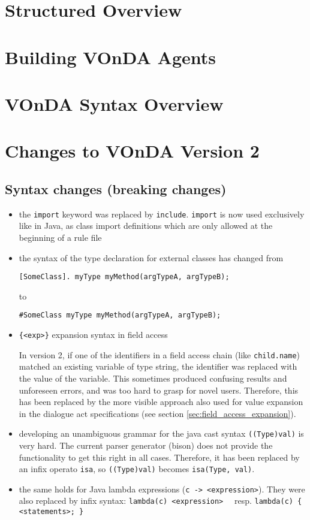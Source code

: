 \documentclass[a4paper]{report}
\newcommand{\vonda}{VOnDA\xspace}
\begin{document}
\chapter{Structured Overview}


\newpage

\newpage

\newpage


\chapter{Building \vonda Agents}

\newpage
\chapter{\vonda Syntax Overview}

\chapter{Changes to \vonda Version 2}
\section*{Syntax changes (breaking changes)}
\begin{itemize}
\item the \texttt{import} keyword was replaced by
  \texttt{include}. \texttt{import} is now used exclusively like in
  Java, as class import definitions which are only allowed at the
  beginning of a rule file
\item the syntax of the type declaration for external classes has
  changed from {\small

\verb|[SomeClass]. myType myMethod(argTypeA, argTypeB);|

{\normalsize to}

\verb|#SomeClass myType myMethod(argTypeA, argTypeB);|}
\item \verb|{<exp>}| expansion syntax in field access

  In version 2, if one of the identifiers in a field access chain
  (like \texttt{child.name}) matched an existing variable of type
  string, the identifier was replaced with the value of the
  variable. This sometimes produced confusing results and unforeseen
  errors, and was too hard to grasp for novel users. Therefore, this
  has been replaced by the more visible approach also used for value
  expansion in the dialogue act specifications (see section
  \ref{sec:field_access_expansion}).
\item developing an unambiguous grammar for the java cast syntax
  \texttt{((Type)val)} is very hard. The current parser generator
  (bison) does not provide the functionality to get this right in all
  cases. Therefore, it has been replaced by an infix operato
  \texttt{isa}, so \texttt{((Type)val)} becomes \texttt{isa(Type,
    val)}.
\item the same holds for Java lambda expressions (\verb|c -> <expression>|). They were also replaced by infix syntax:
  \verb|lambda(c) <expression>| \ \ resp. \verb|lambda(c) { <statements>; }|
\end{itemize}
\end{document}
